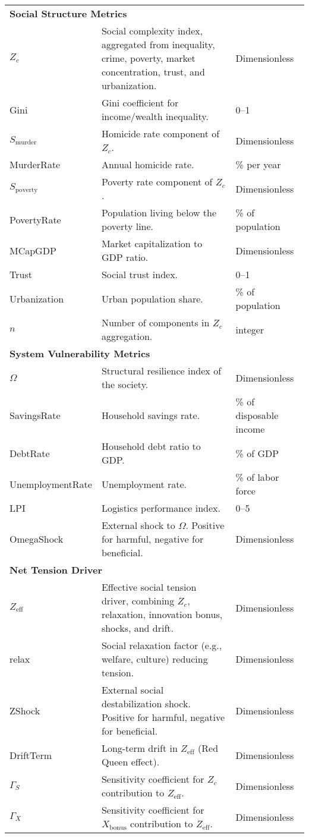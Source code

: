 \documentclass{article}
\begin{document}
\begin{longtable}{p{3cm} p{8cm} p{3cm}}
\multicolumn{3}{l}{\textbf{Social Structure Metrics}} \\
$Z_c$ & Social complexity index, aggregated from inequality, crime, poverty, market concentration, trust, and urbanization. & Dimensionless \\
Gini & Gini coefficient for income/wealth inequality. & 0--1 \\
$S_{\mathrm{murder}}$ & Homicide rate component of $Z_c$. & Dimensionless \\
MurderRate & Annual homicide rate. & \% per year \\
$S_{\mathrm{poverty}}$ & Poverty rate component of $Z_c$. & Dimensionless \\
PovertyRate & Population living below the poverty line. & \% of population \\
MCapGDP & Market capitalization to GDP ratio. & Dimensionless \\
Trust & Social trust index. & 0--1 \\
Urbanization & Urban population share. & \% of population \\
$n$ & Number of components in $Z_c$ aggregation. & integer \\

\multicolumn{3}{l}{\textbf{System Vulnerability Metrics}} \\
$\Omega$ & Structural resilience index of the society. & Dimensionless \\
SavingsRate & Household savings rate. & \% of disposable income \\
DebtRate & Household debt ratio to GDP. & \% of GDP \\
UnemploymentRate & Unemployment rate. & \% of labor force \\
LPI & Logistics performance index. & 0--5 \\
OmegaShock & External shock to $\Omega$. Positive for harmful, negative for beneficial. & Dimensionless \\

\multicolumn{3}{l}{\textbf{Net Tension Driver}} \\
$Z_{\mathrm{eff}}$ & Effective social tension driver, combining $Z_c$, relaxation, innovation bonus, shocks, and drift. & Dimensionless \\
relax & Social relaxation factor (e.g., welfare, culture) reducing tension. & Dimensionless \\
ZShock & External social destabilization shock. Positive for harmful, negative for beneficial. & Dimensionless \\
DriftTerm & Long-term drift in $Z_{\mathrm{eff}}$ (Red Queen effect). & Dimensionless \\
$\Gamma_S$ & Sensitivity coefficient for $Z_c$ contribution to $Z_{\mathrm{eff}}$. & Dimensionless \\
$\Gamma_X$ & Sensitivity coefficient for $X_{\mathrm{bonus}}$ contribution to $Z_{\mathrm{eff}}$. & Dimensionless \\


\end{longtable}
\end{document}
